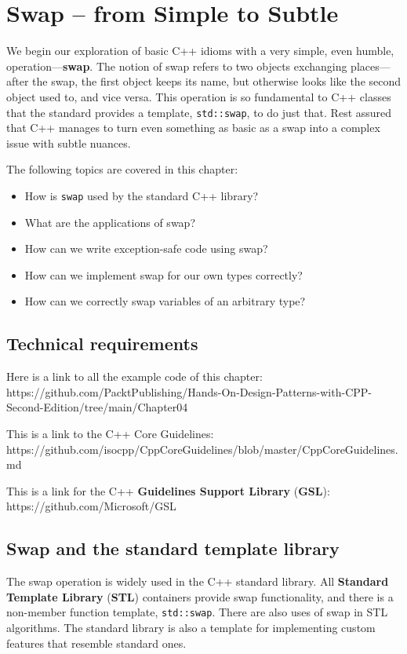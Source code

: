 ﻿\chapter{Swap -- from Simple to Subtle}

We begin our exploration of basic C++ idioms with a very simple, even humble, operation---\textbf{swap}. The notion of swap refers to two objects exchanging places---after the swap, the first object keeps its name, but otherwise looks like the second object used to, and vice versa. This operation is so fundamental to C++ classes that the standard provides a template, \texttt{std::swap}, to do just that. Rest assured that C++ manages to turn even something as basic as a swap into a complex issue with subtle nuances.

The following topics are covered in this chapter:

\begin{itemize}
\item
  How is \texttt{swap} used by the standard C++ library?
\item
  What are the applications of swap?
\item
  How can we write exception-safe code using swap?
\item
  How can we implement swap for our own types correctly?
\item
  How can we correctly swap variables of an arbitrary type?
\end{itemize}

\section{Technical requirements}

Here is a link to all the example code of this chapter: https://github.com/PacktPublishing/Hands-On-Design-Patterns-with-CPP-Second-Edition/tree/main/Chapter04

This is a link to the C++ Core Guidelines: https://github.com/isocpp/CppCoreGuidelines/blob/master/CppCoreGuidelines.md

This is a link for the C++ \textbf{Guidelines Support Library} (\textbf{GSL}): https://github.com/Microsoft/GSL

\section{Swap and the standard template library}

The swap operation is widely used in the C++ standard library. All \textbf{Standard Template Library} (\textbf{STL}) containers provide swap functionality, and there is a non-member function template, \texttt{std::swap}. There are also uses of swap in STL algorithms. The standard library is also a template for implementing custom features that resemble standard ones.

